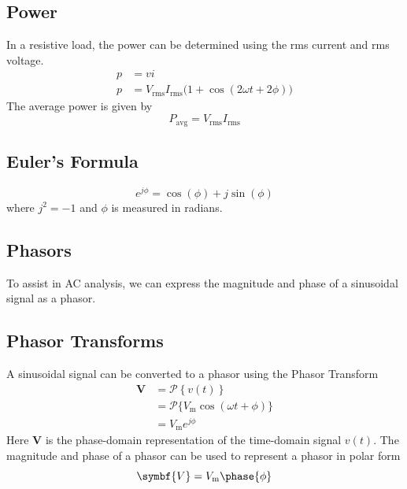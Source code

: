 \documentclass{article}
\begin{document}
\subsection{Power}
\begin{definition}
    In a resistive load, the power can be determined using the rms current and rms voltage.
    \begin{align*}
        p & = vi                                                                                           \\
        p & = V_{\mathrm{rms}} I_{\mathrm{rms}} \bigl( 1 + \cos{\left( 2 \omega t + 2 \phi \right)} \bigr)
    \end{align*}
    The average power is given by
    \begin{equation*}
        P_{\mathrm{avg}} = V_{\mathrm{rms}}I_{\mathrm{rms}}
    \end{equation*}
\end{definition}
\subsection{Euler's Formula}
\begin{theorem}\label{theorem:eulers_formula}
    \begin{equation*}
        e^{j\phi} = \cos{\left( \phi \right)} + j \sin{\left( \phi \right)}
    \end{equation*}
    where \(j^2 = -1\) and \(\phi\) is measured in radians.
\end{theorem}
\subsection{Phasors}
\begin{definition}
    To assist in AC analysis, we can express the magnitude and phase of a sinusoidal signal
    as a phasor.
\end{definition}
\subsection{Phasor Transforms}
\begin{definition}
    A sinusoidal signal can be converted to a phasor using the Phasor Transform
    \begin{align*}
        \symbf{V} & = \mathscr{P}\left\{ v(t) \right\}                                              \\
                  & = \mathscr{P}\bigl\{ V_{\mathrm{m}}\cos{\left( \omega t + \phi \right)} \bigr\} \\
                  & = V_{\mathrm{m}} e^{j\phi}
    \end{align*}
    Here \(\symbf{V}\) is the phase-domain representation of the
    time-domain signal \(v(t)\).
    The magnitude and phase of a phasor can be used to represent a phasor in polar form
    \begin{equation*}
        \symbf{V} = V_{\mathrm{m}} \phase{\phi}
    \end{equation*}
\end{definition}
\end{document}
